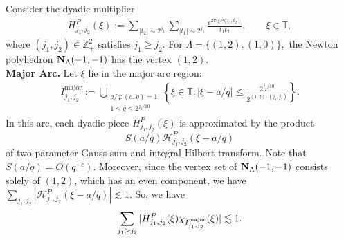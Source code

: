 \documentclass[11 pt,letterpaper]{amsart}
\theoremstyle{plain}
\theoremstyle{definition}
\theoremstyle{remark} \theoremstyle{exam} \theoremstyle{ob}
\numberwithin{equation}{section}
\begin{document}
  Consider  the  dyadic multiplier \begin{align*} H^{P}_{j_1,j_2}(\xi) := \sum_{|t_2|\sim 2^{j_2}} \sum_{|t_1|\sim 2^{j_1}} \frac{e^{2\pi i \xi P(t_1,t_2)}}{t_1t_2}, \qquad \xi\in\mathbb{T}, \end{align*} where $(j_1,j_2)\in\mathbb{Z}_+^2$ satisfies $j_1\geq j_2$. For $\Lambda=\{(1,2),(1,0)\},$ the Newton polyhedron ${\bf N}_{\Lambda}(-1,-1)$ has the vertex $(1,2)$.\\
  
 \noindent\textbf{Major Arc.} Let $\xi$ lie  in the major arc region:
	\begin{align}\label{rt}
			I^{\mathrm{major}}_{j_1,j_2}
		:=
		\bigcup_{\substack{a/q : (a,q)=1 \\ 1\le q \le 2^{j_2/10}}}
		\left\{
		\xi \in \mathbb{T} :
		|\xi - a/q| \le \frac{2^{j_2/10}}{2^{(1,2)\cdot(j_1,j_2)}}
		\right\}.
	\end{align}
	In this arc, each dyadic piece $H_{j_1,j_2}^{P}(\xi)$ is approximated by the product  $$S(a/q)\mathcal{H}^{P}_{j_1,j_2}(\xi-a/q)$$ 
	of two-parameter Gauss-sum  and  integral Hilbert transform. Note that $S(a/q)=O(q^{-c}).$ Moreover, since the vertex set of ${\bf N}_{\Lambda}(-1,-1)$ consists solely of $(1,2)$, which has an even component, we have $\sum_{j_1, j_2} \left| \mathcal{H}^{P}_{j_1,j_2}(\xi-a/q) \right| \lesssim 1.$ So, we have $$ \sum_{j_1\ge j_2} |H^{P}_{j_1,j_2}(\xi)\chi_{I_{j_1,j_2}^{\rm{major}}}(\xi) |\lesssim 1.$$
		
\end{document}
